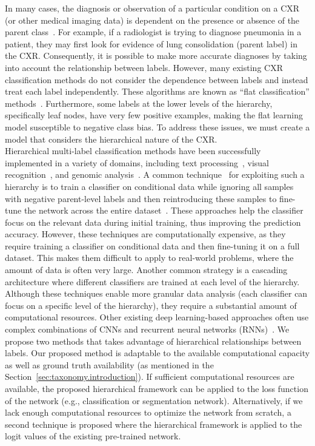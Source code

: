In many cases, the diagnosis or observation of a particular condition on a CXR (or other medical imaging data) is dependent on the presence or absence of the parent class~\cite{vaneeden_Relationship_2012}. For example, if a radiologist is trying to diagnose pneumonia in a patient, they may first look for evidence of lung consolidation (parent label) in the CXR\@. Consequently, it is possible to make more accurate diagnoses by taking into account the relationship between labels\@. However, many existing CXR classification methods do not consider the dependence between labels and instead treat each label independently. These algorithms are known as ``flat classification'' methods~\cite{alaydie_Exploiting_2012}. Furthermore, some labels at the lower levels of the hierarchy, specifically leaf nodes, have very few positive examples, making the flat learning model susceptible to negative class bias. To address these issues, we must create a model that considers the hierarchical nature of the CXR\@. \\
%
Hierarchical multi-label classification methods have been successfully implemented in a variety of domains, including text processing~\cite{aly_Hierarchical_2019}, visual recognition~\cite{bi_Mandatory_2014}, and genomic analysis~\cite{bi_BayesOptimal_2015}. A common technique~\cite{chen_Deep_2019} for exploiting such a hierarchy is to train a classifier on conditional data while ignoring all samples with negative parent-level labels and then reintroducing these samples to fine-tune the network across the entire dataset~\cite{chen_Deep_2019}. These approaches help the classifier focus on the relevant data during initial training, thus improving the prediction accuracy.  However, these techniques are computationally expensive, as they require training a classifier on conditional data and then fine-tuning it on a full dataset. This makes them difficult to apply to real-world problems, where the amount of data is often very large.   Another common strategy is a cascading architecture where different classifiers are trained at each level of the hierarchy. Although these techniques enable more granular data analysis (each classifier can focus on a specific level of the hierarchy), they require a substantial amount of computational resources. Other existing deep learning-based approaches often use complex combinations of CNNs and recurrent neural networks (RNNs)~\cite{guo_CNNRNN_2018,kowsari_HDLTex_2017}.
%
We propose two methods that takes advantage of hierarchical relationships between labels. Our proposed method is adaptable to the available computational capacity as well as ground truth availability (as mentioned in the Section~\ref{sec:taxonomy.introduction}). If sufficient computational resources are available, the proposed hierarchical framework can be applied to the loss function of the network (e.g., classification or segmentation network). Alternatively, if we lack enough computational resources to optimize the network from scratch, a second technique is proposed where the hierarchical framework is applied to the logit values of the existing pre-trained network.
